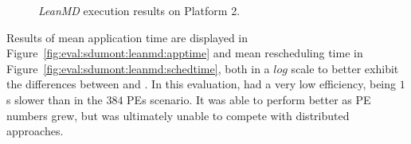 \begin{figure}[!ht]
 \centering
 \caption{\textit{LeanMD} execution results on Platform 2.}
 \label{fig:eval:sdumont:leanmd}
\end{figure}



Results of mean application time are displayed in Figure~\ref{fig:eval:sdumont:leanmd:apptime} and mean rescheduling time in Figure~\ref{fig:eval:sdumont:leanmd:schedtime}, both in a $log$ scale to better exhibit the differences between \distributedlb and \packdrop.
In this evaluation,  had a very low efficiency, being $1$s slower than \greedylb in the $384$ PEs scenario.
It was able to perform better as PE numbers grew, but was ultimately unable to compete with distributed approaches.

